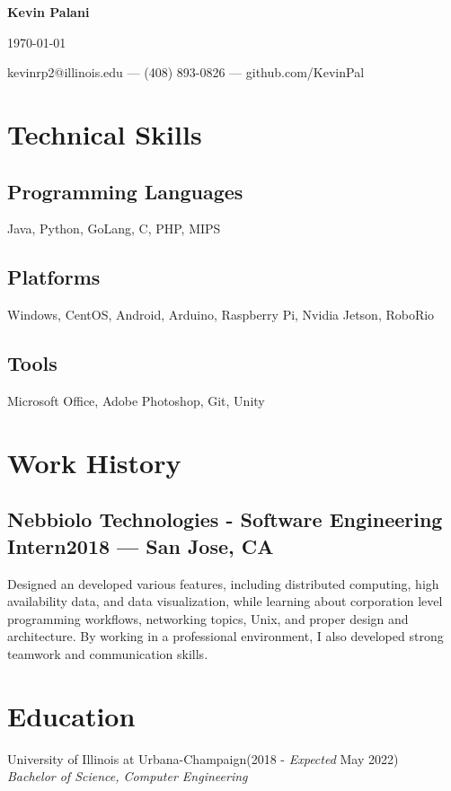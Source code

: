 \documentclass[letterpaper,12pt]{article}
\makeatletter
\newcommand\textbox[1]{%
	\parbox{.333\textwidth}{#1}%
}
\renewcommand{\maketitle}{
	\begin{center}
		\noindent\textbox{\hfill}\textbox{\hfil\bfseries\huge Kevin Palani\hfil}\textbox{\hfill \today}
		{kevinrp2@illinois.edu --- (408) 893-0826 --- github.com/KevinPal}
	\end{center} }
\makeatother
\begin{document}
\maketitle
\section{Technical Skills}
\subsection{Programming Languages}
Java, Python, GoLang, C, PHP, MIPS
\vspace*{-4mm}
\subsection{Platforms}
Windows, CentOS, Android, Arduino, Raspberry Pi, Nvidia Jetson, RoboRio
\vspace*{-4mm}
\subsection{Tools}
Microsoft Office, Adobe Photoshop, Git, Unity
\vspace*{-4mm}
\section{Work History}
\subsection{Nebbiolo Technologies - Software Engineering Intern\null\hfill 2018 --- San Jose, CA}
Designed an developed various features, including distributed computing, high availability data, and data visualization, while learning about corporation level programming workflows, networking topics, Unix, and proper design and architecture.
By working in a professional environment, I also developed strong teamwork and communication skills.
\vspace*{-2mm}
\section{Education}
University of Illinois at Urbana-Champaign\null\hfill(2018 - \emph{Expected} May 2022)\\
		   \emph{Bachelor of Science, Computer Engineering}
\end{document}
